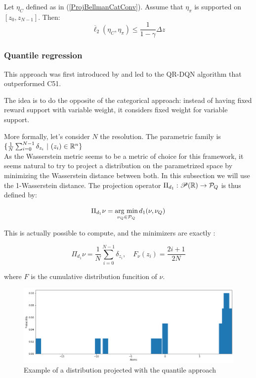 \begin{lemma}
    Let $\eta_C$ defined as in (\ref{ProjBellmanCatConv}). Assume that $\eta_\pi$ is supported on $[z_0, z_{N-1}]$. Then:
    \[ \overline{\ell}_2(\eta_C, \eta_\pi) \leq \frac{1}{1-\gamma} \Delta z \]
\end{lemma}

\subsubsection*{Quantile regression}

This approach was first introduced by \cite[Dabney et al.]{dabney_distributional_2017} and led to the \textsc{QR-DQN} algorithm that outperformed C51.

The idea is to do the opposite of the categorical approach: instead of having fixed reward support with variable weight, it considers fixed weight for variable support.



More formally, let’s consider $N$ the resolution. The parametric family is $\{ \frac{1}{N} \sum_{i = 0}^{N-1} \delta_{z_i} \ | \ (z_i)\in \mathbb{R}^n \}$\\

As the Wasserstein metric seems to be a metric of choice for this framework, it seems natural to try to project a distribution on the parametrized space by minimizing the Wasserstein distance between both.
In this subsection we will use the 1-Wasserstein distance. The projection operator $\Pi_{d_1} : \mathscr{P}(\mathbb{R}) \rightarrow \mathcal{P}_Q$ is thus defined by:

\begin{equation}
    \Pi_{d_1}\nu = \operatorname*{\mbox{arg min}}_{\nu_Q \in \mathcal{P}_Q} d_1(\nu, \nu_Q)
\end{equation}

This is actually possible to compute, and the minimizers are exactly :

\[ \Pi_{d_1}\nu = \frac{1}{N} \sum_{i = 0}^{N-1} \delta_{z_i}, \quad F_\nu(z_i) = \frac{2i + 1}{2N} \]

where $F$ is the cumulative distribution funcition of $\nu$.

\begin{figure}[!ht]
    \centering
    \includegraphics[height=0.2\textheight]{figures/personal_work/quantile.png}
    \caption{Example of a distribution projected with the quantile approach}
\end{figure}

